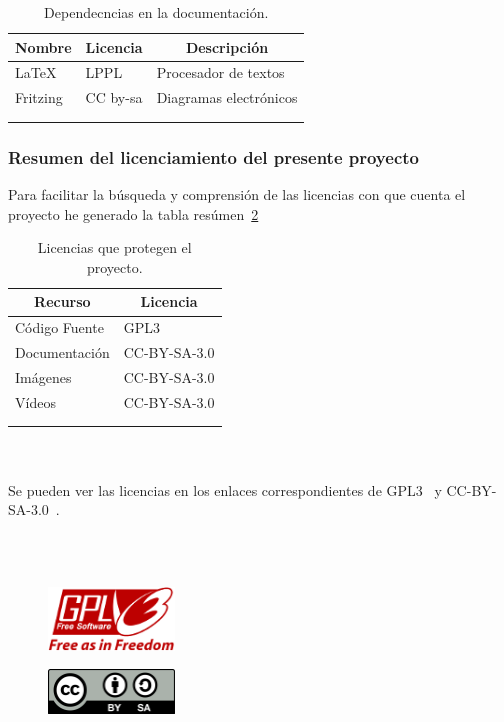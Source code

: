 \begin{longtable}[c]{@{}lll@{}}
\toprule
\multicolumn{1}{c}{\textbf{Nombre}} & \multicolumn{1}{c}{\textbf{Licencia}} & \multicolumn{1}{c}{\textbf{Descripción}} \\* \midrule
\endfirsthead
%
\endhead
%
\bottomrule
\endfoot
%
\endlastfoot
%
\LaTeX{}~\cite{wiki:latex} & LPPL & Procesador de textos \\
Fritzing & CC by-sa & Diagramas electrónicos \\* \bottomrule \\
\caption{Dependecncias en la documentación.}
\label{tab:my-table}\\
\end{longtable}


\subsubsection{Resumen del licenciamiento del presente proyecto}
Para facilitar la búsqueda y comprensión de las licencias con que cuenta el proyecto he generado la tabla resúmen~\ref{tab:licproy}

\begin{longtable}[c]{@{}ll@{}}
\toprule
\multicolumn{1}{c}{\textbf{Recurso}} & \multicolumn{1}{c}{\textbf{Licencia}} \\* \midrule
\endfirsthead
%
\endhead
%
\bottomrule
\endfoot
%
\endlastfoot
%
Código Fuente & GPL3 \\
Documentación & CC-BY-SA-3.0 \\
Imágenes & CC-BY-SA-3.0 \\
Vídeos & CC-BY-SA-3.0 \\* \bottomrule \\
\caption{Licencias que protegen el proyecto.}
\label{tab:licproy}\\
\end{longtable}
\\ \\

Se pueden ver las licencias en los enlaces correspondientes de GPL3~\cite{lic:GPL3} y CC-BY-SA-3.0~\cite{lic:CCbysa3}.

\\ \\ 

\begin{figure}[h]
\centering
\includegraphics[width=0.3\textwidth]{img/Diagramas/gplv3-with-text-136x68.png}
\end{figure}

\begin{figure}[h]
\centering
\includegraphics[width=0.3\textwidth]{img/Diagramas/ccbysa.png}
\end{figure}




